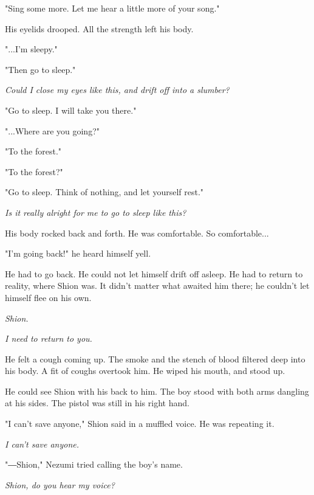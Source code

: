 "Sing some more. Let me hear a little more of your song."


His eyelids drooped. All the strength left his body.

"...I'm sleepy."

"Then go to sleep."

\emph{Could I close my eyes like this, and drift off into a slumber?}

"Go to sleep. I will take you there."

"...Where are you going?"

"To the forest."

"To the forest?"

"Go to sleep. Think of nothing, and let yourself rest."

\emph{Is it really alright for me to go to sleep like this?}

His body rocked back and forth. He was comfortable. So comfortable...

"I'm going back!" he heard himself yell.

He had to go back. He could not let himself drift off asleep. He had to
return to reality, where Shion was. It didn't matter what awaited him
there; he couldn't let himself flee on his own.

\emph{Shion.}

\emph{I need to return to you.}

\myspace

He felt a cough coming up. The smoke and the stench of blood filtered
deep into his body. A fit of coughs overtook him. He wiped his mouth,
and stood up.

He could see Shion with his back to him. The boy stood with both arms
dangling at his sides. The pistol was still in his right hand.

"I can't save anyone," Shion said in a muffled voice. He was repeating
it.

\emph{I can't save anyone.}

"―Shion," Nezumi tried calling the boy's name.

\emph{Shion, do you hear my voice?}


